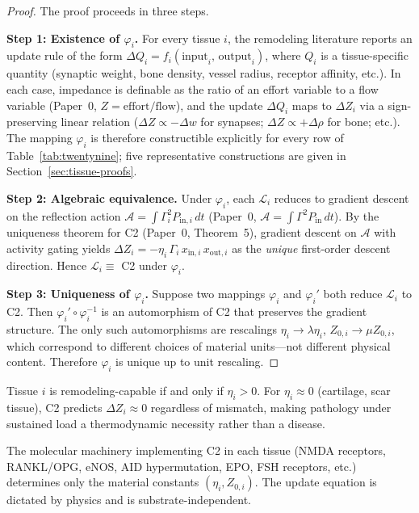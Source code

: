 \documentclass[aps,pre,twocolumn,superscriptaddress,floatfix]{revtex4-2}
\begin{document}
\begin{proof}
The proof proceeds in three steps.

\textbf{Step 1: Existence of $\varphi_i$.}
For every tissue $i$, the remodeling literature reports
an update rule of the form
$\Delta Q_i = f_i(\text{input}_i,\, \text{output}_i)$,
where $Q_i$ is a tissue-specific quantity (synaptic
weight, bone density, vessel radius, receptor affinity,
etc.).
In each case, impedance is definable as the ratio of an
effort variable to a flow variable
(Paper~0, $Z = \text{effort}/\text{flow}$),
and the update $\Delta Q_i$ maps to $\Delta Z_i$ via
a sign-preserving linear relation
($\Delta Z \propto -\Delta w$ for synapses;
$\Delta Z \propto +\Delta\rho$ for bone; etc.).
The mapping $\varphi_i$ is therefore constructible
explicitly for every row of Table~\ref{tab:twentynine};
five representative constructions are given in
Section~\ref{sec:tissue-proofs}.

\textbf{Step 2: Algebraic equivalence.}
Under $\varphi_i$, each $\mathcal{L}_i$ reduces to
gradient descent on the reflection action
$\mathcal{A} = \int \Gamma_i^2 P_{\text{in},i}\,dt$
(Paper~0, $\mathcal{A} = \int \Gamma^2 P_{\text{in}}\,dt$).
By the uniqueness theorem for C2
(Paper~0, Theorem~5), gradient descent on
$\mathcal{A}$ with activity gating yields
$\Delta Z_i = -\eta_i\,\Gamma_i\,
x_{\text{in},i}\,x_{\text{out},i}$
as the \emph{unique} first-order descent direction.
Hence $\mathcal{L}_i \equiv$ C2 under $\varphi_i$.

\textbf{Step 3: Uniqueness of $\varphi_i$.}
Suppose two mappings $\varphi_i$ and $\varphi_i'$ both
reduce $\mathcal{L}_i$ to C2.
Then $\varphi_i' \circ \varphi_i^{-1}$ is an
automorphism of C2 that preserves the gradient
structure.
The only such automorphisms are rescalings
$\eta_i \to \lambda\eta_i$, $Z_{0,i} \to \mu Z_{0,i}$,
which correspond to different choices of material
units---not different physical content.
Therefore $\varphi_i$ is unique up to unit rescaling.
\end{proof}

\begin{corollary}
\label{cor:plasticity}
Tissue $i$ is remodeling-capable if and only if
$\eta_i > 0$.
For $\eta_i \approx 0$ (cartilage, scar tissue),
C2 predicts $\Delta Z_i \approx 0$ regardless of
mismatch, making pathology under sustained load
a thermodynamic necessity rather than a disease.
\end{corollary}

\begin{corollary}
\label{cor:substrate}
The molecular machinery implementing C2 in each
tissue (NMDA receptors, RANKL/OPG, eNOS, AID
hypermutation, EPO, FSH receptors, etc.)
determines only the material constants
$(\eta_i, Z_{0,i})$.
The update equation is dictated by physics
and is substrate-independent.
\end{corollary}
\end{document}
